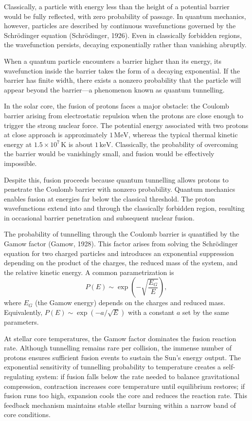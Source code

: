 Classically, a particle with energy less than the height of a potential barrier would be fully reflected, with zero probability of passage. In quantum mechanics, however, particles are described by continuous wavefunctions governed by the Schrödinger equation (Schrödinger, 1926). Even in classically forbidden regions, the wavefunction persists, decaying exponentially rather than vanishing abruptly.

When a quantum particle encounters a barrier higher than its energy, its wavefunction inside the barrier takes the form of a decaying exponential. If the barrier has finite width, there exists a nonzero probability that the particle will appear beyond the barrier—a phenomenon known as quantum tunnelling.

In the solar core, the fusion of protons faces a major obstacle: the Coulomb barrier arising from electrostatic repulsion when the protons are close enough to trigger the strong nuclear force. The potential energy associated with two protons at close approach is approximately $1\,\text{MeV}$, whereas the typical thermal kinetic energy at $1.5 \times 10^7\,\text{K}$ is about $1\,\text{keV}$. Classically, the probability of overcoming the barrier would be vanishingly small, and fusion would be effectively impossible.

Despite this, fusion proceeds because quantum tunnelling allows protons to penetrate the Coulomb barrier with nonzero probability. Quantum mechanics enables fusion at energies far below the classical threshold. The proton wavefunctions extend into and through the classically forbidden region, resulting in occasional barrier penetration and subsequent nuclear fusion.

The probability of tunnelling through the Coulomb barrier is quantified by the Gamow factor (Gamow, 1928). This factor arises from solving the Schrödinger equation for two charged particles and introduces an exponential suppression depending on the product of the charges, the reduced mass of the system, and the relative kinetic energy. A common parametrization is
\[
P(E) \sim \exp\!\left( -\sqrt{\frac{E_G}{E}} \right),
\]
where $E_G$ (the Gamow energy) depends on the charges and reduced mass. Equivalently, $P(E) \sim \exp(-a/\sqrt{E})$ with a constant $a$ set by the same parameters.

At stellar core temperatures, the Gamow factor dominates the fusion reaction rate. Although tunnelling remains rare per collision, the immense number of protons ensures sufficient fusion events to sustain the Sun's energy output. The exponential sensitivity of tunnelling probability to temperature creates a self-regulating system: if fusion falls below the rate needed to balance gravitational compression, contraction increases core temperature until equilibrium restores; if fusion runs too high, expansion cools the core and reduces the reaction rate. This feedback mechanism maintains stable stellar burning within a narrow band of core conditions.

